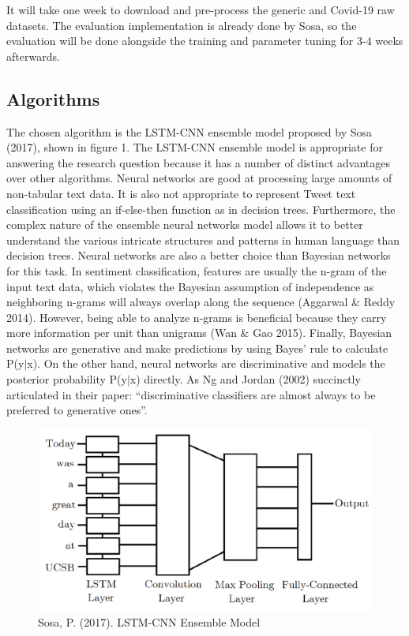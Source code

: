 \documentclass[letterpaper]{article} %
\begin{document}
It will take one week to download and pre-process the generic and Covid-19 raw datasets. The evaluation implementation is already done by Sosa, so the evaluation will be done alongside the training and parameter tuning for 3-4 weeks afterwards. 

\subsection{Algorithms}

The chosen algorithm is the LSTM-CNN ensemble model proposed by Sosa (2017), shown in figure 1.  The LSTM-CNN ensemble model is appropriate for answering the research question because it has a number of distinct advantages over other algorithms. Neural networks are good at processing large amounts of non-tabular text data. It is also not appropriate to represent Tweet text classification using an if-else-then function as in decision trees. Furthermore, the complex nature of the ensemble neural networks model allows it to better understand the various intricate structures and patterns in human language than decision trees. Neural networks are also a better choice than Bayesian networks for this task. In sentiment classification, features are usually the n-gram of the input text data, which violates the Bayesian assumption of independence as neighboring n-grams will always overlap along the sequence (Aggarwal \& Reddy 2014). However, being able to analyze n-grams is beneficial because they carry more information per unit than unigrams (Wan \& Gao 2015). Finally, Bayesian networks are generative and make predictions by using Bayes' rule to calculate P(y$|$x). On the other hand, neural networks are discriminative and models the posterior probability P(y$|$x) directly. As Ng and Jordan (2002) succinctly articulated in their paper: \textquotedblleft{}discriminative classifiers are almost always to be preferred to generative ones\textquotedblright{}. 

\begin{figure}
  \includegraphics[width=\linewidth]{figure1.png}
  \caption{Sosa, P. (2017). LSTM-CNN Ensemble Model}
  \label{fig:fig1}
\end{figure}
\end{document}
